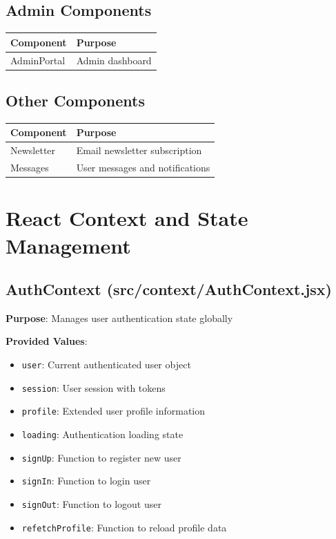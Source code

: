 \documentclass[12pt,a4paper]{report}
\begin{document}
\subsection{Admin Components}

\begin{longtable}{|p{3cm}|p{5cm}|}
\hline
\textbf{Component} & \textbf{Purpose} \\
\hline
AdminPortal & Admin dashboard \\
\hline
\end{longtable}

\subsection{Other Components}

\begin{longtable}{|p{3cm}|p{5cm}|}
\hline
\textbf{Component} & \textbf{Purpose} \\
\hline
Newsletter & Email newsletter subscription \\
\hline
Messages & User messages and notifications \\
\hline
\end{longtable}

\section{React Context and State Management}

\subsection{AuthContext (src/context/AuthContext.jsx)}

\textbf{Purpose}: Manages user authentication state globally

\textbf{Provided Values}:
\begin{itemize}
    \item \texttt{user}: Current authenticated user object
    \item \texttt{session}: User session with tokens
    \item \texttt{profile}: Extended user profile information
    \item \texttt{loading}: Authentication loading state
    \item \texttt{signUp}: Function to register new user
    \item \texttt{signIn}: Function to login user
    \item \texttt{signOut}: Function to logout user
    \item \texttt{refetchProfile}: Function to reload profile data
\end{itemize}
\end{document}
